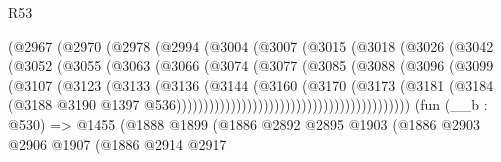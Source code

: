 \begin{lexlean}{R53}
\begin{coremodule}
                            (@2967
                              (@2970
                                (@2978
                                  (@2994
                                    (@3004
                                      (@3007
                                        (@3015
                                          (@3018
                                            (@3026
                                              (@3042
                                                (@3052
                                                  (@3055
                                                    (@3063
                                                      (@3066
                                                        (@3074
                                                          (@3077
                                                            (@3085
                                                              (@3088
                                                                (@3096
                                                                  (@3099
                                                                    (@3107
                                                                      (@3123
                                                                        (@3133
                                                                          (@3136
                                                                            (@3144
                                                                              (@3160
                                                                                (@3170
                                                                                  (@3173
                                                                                    (@3181
                                                                                      (@3184
                                                                                        (@3188
                                                                                          @3190
                                                                                          @1397
                                                                                          @536)))))))))))))))))))))))))))))))))))))))))))
    (fun (__b : @530) =>
    @1455
      (@1888
        @1899
        (@1886
          @2892
          @2895
          @1903
          (@1886
            @2903
            @2906
            @1907
            (@1886
              @2914
              @2917

\end{coremodule}
\end{lexlean}
